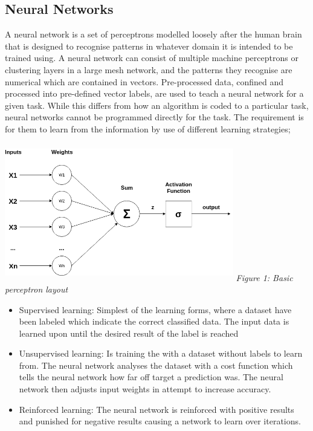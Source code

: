 \documentclass[oneside, 12pt]{article}
\begin{document}
		\subsection{Neural Networks}\label{networks}
			A neural network is a set of perceptrons modelled loosely after the human brain that is designed to recognise patterns in whatever domain it is intended to be trained using. A neural network can consist of multiple machine perceptrons or clustering layers in a large mesh network, and the patterns they recognise are numerical which are contained in vectors. Pre-processed data, confined and processed into pre-defined vector labels, are used to teach a neural network for a given task. While this differs from how an algorithm is coded to a particular task, neural networks cannot be programmed directly for the task. The requirement is for them to learn from the information by use of different learning strategies; \cite{14}\cite{15}
			
			\begin{center}
				\includegraphics[width=10cm,height=6cm]{images/perceptron.png}
				\newline
				\textit{Figure 1: Basic perceptron layout}
			\end{center}
			
			\begin{itemize}
				\item Supervised learning: Simplest of the learning forms, where a dataset have been labeled which indicate the correct classified data. The input data is learned upon until the desired result of the label is reached \cite{16}
				\item Unsupervised learning: Is training the with a dataset without labels to learn from. The neural network analyses the dataset with a cost function which tells the neural network how far off target a prediction was. The neural network then adjusts input weights in attempt to increase accuracy. \cite{15}
				\item Reinforced learning: The neural network is reinforced with positive results and punished for negative results causing a network to learn over iterations. 
			\end{itemize}
		
\end{document}
